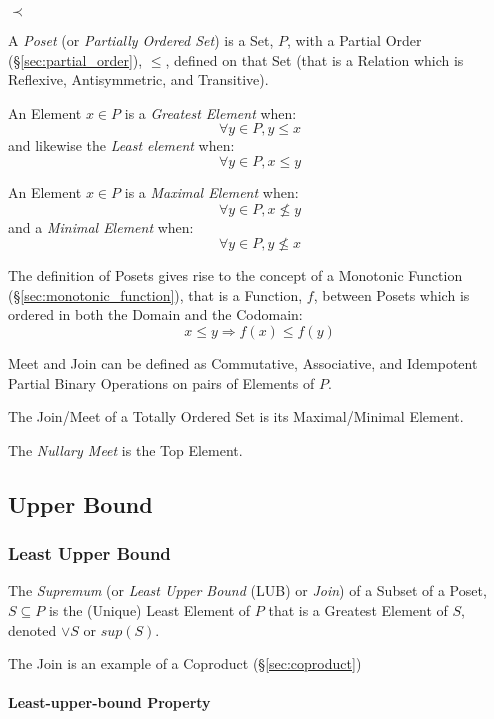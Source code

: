 $\prec$

A \emph{Poset} (or \emph{Partially Ordered Set}) is a Set, $P$, with a
Partial Order (\S\ref{sec:partial_order}), $\leq$, defined on that
Set (that is a Relation which is Reflexive, Antisymmetric, and
Transitive).

An Element $x \in P$ is a \emph{Greatest Element} when:
\[
  \forall y \in P, y \leq x
\]
and likewise the \emph{Least element} when:
\[
  \forall y \in P, x \leq y
\]

An Element $x \in P$ is a \emph{Maximal Element} when:
\[
  \forall y \in P, x \nleq y
\]
and a \emph{Minimal Element} when:
\[
  \forall y \in P, y \nleq x
\]

The definition of Posets gives rise to the concept of a Monotonic
Function (\S\ref{sec:monotonic_function}), that is a Function, $f$,
between Posets which is ordered in both the Domain and the Codomain:
\[
  x \leq y \Rightarrow f(x) \leq f(y)
\]


Meet and Join can be defined as Commutative, Associative, and
Idempotent Partial Binary Operations on pairs of Elements of $P$.

The Join/Meet of a Totally Ordered Set is its Maximal/Minimal Element.

The \emph{Nullary Meet} is the Top Element.



\subsection{Upper Bound}\label{sec:upper_bound}

\subsubsection{Least Upper Bound}\label{sec:least_upperbound}

The \emph{Supremum} (or \emph{Least Upper Bound} (LUB) or \emph{Join})
of a Subset of a Poset, $S \subseteq P$ is the (Unique) Least Element
of $P$ that is a Greatest Element of $S$, denoted $\vee S$ or $sup
(S)$.

The Join is an example of a Coproduct (\S\ref{sec:coproduct})



\paragraph{Least-upper-bound Property}\label{sec:leastupperbound_property}\hfill



